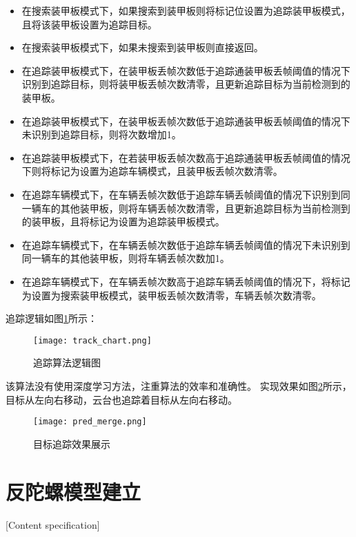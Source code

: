 \begin{itemize}[itemindent=2em]
\item 在搜索装甲板模式下，如果搜索到装甲板则将标记位设置为追踪装甲板模式，且将该装甲板设置为追踪目标。
\item 在搜索装甲板模式下，如果未搜索到装甲板则直接返回。
\item 在追踪装甲板模式下，在装甲板丢帧次数低于追踪通装甲板丢帧阈值的情况下识别到追踪目标，则将装甲板丢帧次数清零，且更新追踪目标为当前检测到的装甲板。
\item 在追踪装甲板模式下，在装甲板丢帧次数低于追踪通装甲板丢帧阈值的情况下未识别到追踪目标，则将次数增加1。
\item 在追踪装甲板模式下，在若装甲板丢帧次数高于追踪通装甲板丢帧阈值的情况下则将标记为设置为追踪车辆模式，且装甲板丢帧次数清零。
\item 在追踪车辆模式下，在车辆丢帧次数低于追踪车辆丢帧阈值的情况下识别到同一辆车的其他装甲板，则将车辆丢帧次数清零，且更新追踪目标为当前检测到的装甲板，且将标记为设置为追踪装甲板模式。
\item 在追踪车辆模式下，在车辆丢帧次数低于追踪车辆丢帧阈值的情况下未识别到同一辆车的其他装甲板，则将车辆丢帧次数加1。
\item 在追踪车辆模式下，在车辆丢帧次数高于追踪车辆丢帧阈值的情况下，将标记为设置为搜索装甲板模式，装甲板丢帧次数清零，车辆丢帧次数清零。
\end{itemize}

追踪逻辑如图\ref{追踪算法逻辑图}所示：

\begin{figure}[H]
    \centering
    \texttt{[image: track\_chart.png]} 
    \caption{追踪算法逻辑图} 
    \label{追踪算法逻辑图} 
\end{figure} 

\par

该算法没有使用深度学习方法，注重算法的效率和准确性。
实现效果如图\ref{pred_merge}所示，目标从左向右移动，云台也追踪着目标从左向右移动。

\begin{figure}[H]
    \centering
    \texttt{[image: pred\_merge.png]} 
    \caption{目标追踪效果展示} 
    \label{pred_merge} 
\end{figure} 


\section{反陀螺模型建立}[Content specification]

